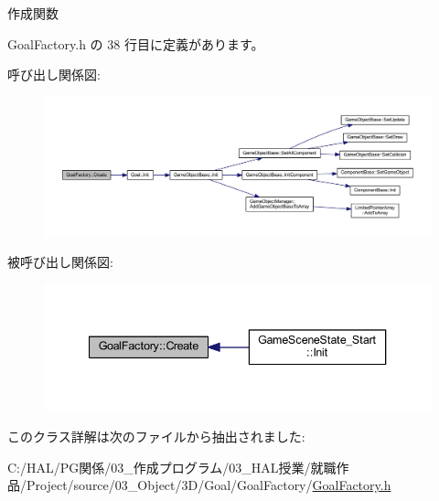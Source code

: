 作成関数 



 Goal\+Factory.\+h の 38 行目に定義があります。

呼び出し関係図\+:\nopagebreak
\begin{figure}[H]
\begin{center}
\leavevmode
\includegraphics[width=350pt]{class_goal_factory_af0b52f5fd6e567a05985285369be7b2e_cgraph}
\end{center}
\end{figure}
被呼び出し関係図\+:\nopagebreak
\begin{figure}[H]
\begin{center}
\leavevmode
\includegraphics[width=340pt]{class_goal_factory_af0b52f5fd6e567a05985285369be7b2e_icgraph}
\end{center}
\end{figure}


このクラス詳解は次のファイルから抽出されました\+:\begin{DoxyCompactItemize}
\item 
C\+:/\+H\+A\+L/\+P\+G関係/03\+\_\+作成プログラム/03\+\_\+\+H\+A\+L授業/就職作品/\+Project/source/03\+\_\+\+Object/3\+D/\+Goal/\+Goal\+Factory/\mbox{\hyperlink{_goal_factory_8h}{Goal\+Factory.\+h}}\end{DoxyCompactItemize}
